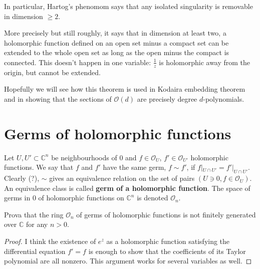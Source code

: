 \noindent
In particular, Hartog's phenomom says 
that any isolated singularity is removable in dimension $\geq 2$.

More precisely but still roughly,
it says that in dimension at least two,
a holomorphic function defined on an open set minus a compact set
can be extended to the whole open set
as long as the open minus the compact is connected.
This doesn't happen in one variable: $\frac{1}{z}$
is holomorphic away from the origin, but cannot be extended.

Hopefully we will see how this theorem is used
in Kodaira embedding theorem and in showing that
the sections of $\mathcal{O}(d)$ are precisely degree $d$-polynomials.


\begin{theorem}
\label{theorem-hartog}
\end{theorem}

\section{Germs of holomorphic functions}
\label{section-germs-of-holomorphic-functions}

\begin{definition}
\label{definition-germ-of-holomorphic-function}
Let $U,U' \subset \mathbb{C}^n$ be neighbourhoods of $0$ and $f \in
\mathcal{O}_U$, $f'\in\mathcal{O}_{U'}$ holomorphic functions. We say that $f$
and $f'$ have the same germ, $f\sim f'$, if $f|_{U\cap U'}=f'|_{U\cap U'}$.
Clearly (?), $\sim$ gives an equivalence relation on the set of pairs $(U\ni 0,
f\in \mathcal{O}_U)$. An equivalence class is called {\bf germ of a holomorphic
function}. The space of germs in $0$ of holomorphic functions on $\mathbb{C}^n$
is denoted $\mathcal{O}_n$.
\end{definition}

\begin{exercise}
\label{exercise-stalk-is-not-finitely-generated-over-C}
Prova that the ring $\mathcal{O}_n$ of germs of holomorphic functions is not
finitely generated over $\mathbb{C}$ for any $n>0$.
\end{exercise}

\begin{proof}
I think the existence of $e^z$ as a holomorphic function satisfying the
differential equation $f'=f$ is enough to show that the coefficients of its
Taylor polynomial are all nonzero. This argument works for several variables as
well.
\end{proof}

